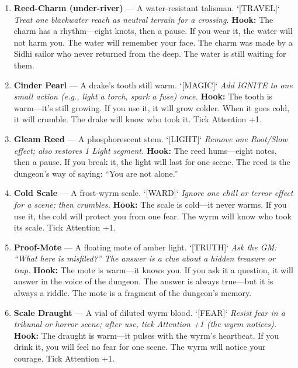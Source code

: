 \begin{enumerate}
\item \textbf{Reed-Charm (under-river)} --- A water-resistant talisman. `[TRAVEL]`
  \hfill \textit{Treat one blackwater reach as neutral terrain for a crossing.}
  \textbf{Hook:} The charm has a rhythm---eight knots, then a pause. If you wear it, the water will not harm you. The water will remember your face. The charm was made by a Sidhi sailor who never returned from the deep. The water is still waiting for them.

\item \textbf{Cinder Pearl} --- A drake's tooth still warm. `[MAGIC]`
  \hfill \textit{Add IGNITE to one small action (e.g., light a torch, spark a fuse) once.}
  \textbf{Hook:} The tooth is warm---it's still growing. If you use it, it will grow colder. When it goes cold, it will crumble. The drake will know who took it. Tick Attention +1.

\item \textbf{Gleam Reed} --- A phosphorescent stem. `[LIGHT]`
  \hfill \textit{Remove one Root/Slow effect; also restores 1 Light segment.}
  \textbf{Hook:} The reed hums---eight notes, then a pause. If you break it, the light will last for one scene. The reed is the dungeon's way of saying: ``You are not alone.''

\item \textbf{Cold Scale} --- A frost-wyrm scale. `[WARD]`
  \hfill \textit{Ignore one chill or terror effect for a scene; then crumbles.}
  \textbf{Hook:} The scale is cold---it never warms. If you use it, the cold will protect you from one fear. The wyrm will know who took its scale. Tick Attention +1.

\item[J] \textbf{Proof-Mote} --- A floating mote of amber light. `[TRUTH]`
  \hfill \textit{Ask the GM: ``What here is misfiled?'' The answer is a clue about a hidden treasure or trap.}
  \textbf{Hook:} The mote is warm---it knows you. If you ask it a question, it will answer in the voice of the dungeon. The answer is always true---but it is always a riddle. The mote is a fragment of the dungeon's memory.

\item[Q] \textbf{Scale Draught} --- A vial of diluted wyrm blood. `[FEAR]`
  \hfill \textit{Resist fear in a tribunal or horror scene; after use, tick Attention +1 (the wyrm notices).}
  \textbf{Hook:} The draught is warm---it pulses with the wyrm's heartbeat. If you drink it, you will feel no fear for one scene. The wyrm will notice your courage. Tick Attention +1.


\end{enumerate}
